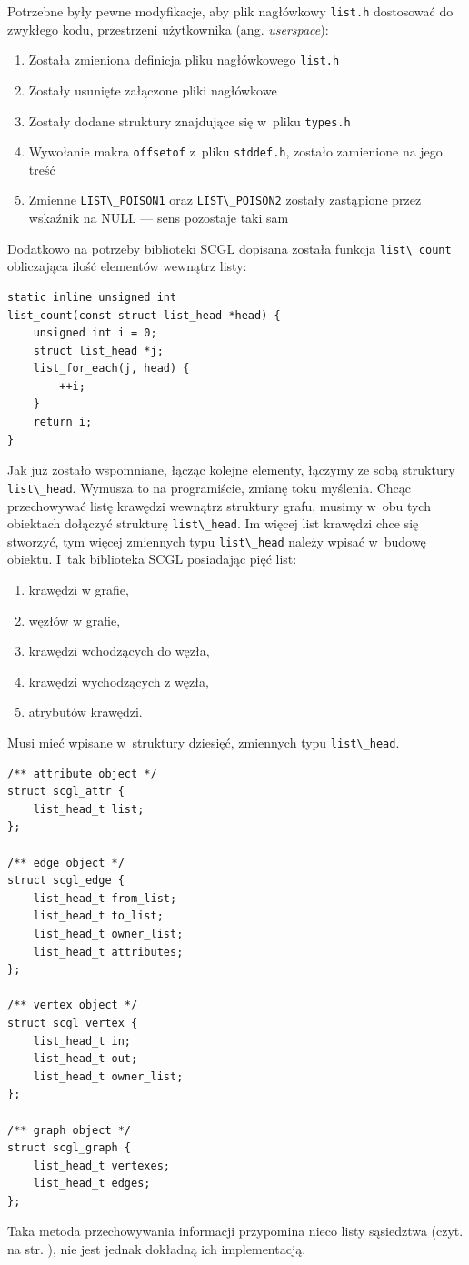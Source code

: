 \documentclass[a4paper,12pt,polish,oneside,openright]{thesis}
\newcommand\code[1]{\lstinline[style=line]{#1}}
\begin{document}
Potrzebne były pewne modyfikacje, aby plik nagłówkowy \code{list.h} dostosować do zwykłego kodu, przestrzeni użytkownika (ang. \emph{userspace}):
\begin{enumerate}
	\item Została zmieniona definicja pliku nagłówkowego \code{list.h}
	\item Zostały usunięte załączone pliki nagłówkowe
	\item Zostały dodane struktury znajdujące się w~pliku \code{types.h}
	\item Wywołanie makra \code{offsetof} z~pliku \code{stddef.h}, zostało zamienione na jego treść
	\item Zmienne \code{LIST\_POISON1} oraz \code{LIST\_POISON2} zostały zastąpione przez wskaźnik na NULL --- sens pozostaje taki sam
\end{enumerate}
Dodatkowo na potrzeby biblioteki SCGL dopisana została funkcja \code{list\_count} obliczająca ilość elementów wewnątrz listy:
\begin{lstlisting}[style=code,caption=Ciało funkcji {list\_count}]
static inline unsigned int
list_count(const struct list_head *head) {
	unsigned int i = 0;
	struct list_head *j;
	list_for_each(j, head) {
		++i;
	}
	return i;
}
\end{lstlisting}

Jak już zostało wspomniane, łącząc kolejne elementy, łączymy ze sobą struktury \code{list\_head}.
Wymusza to na programiście, zmianę toku myślenia.
Chcąc przechowywać listę krawędzi wewnątrz struktury grafu, musimy w~obu tych obiektach dołączyć strukturę \code{list\_head}.
Im więcej list krawędzi chce się stworzyć, tym więcej zmiennych typu \code{list\_head} należy wpisać w~budowę obiektu.
I~tak biblioteka SCGL posiadając pięć list:
\begin{enumerate}
	\item krawędzi w grafie,
	\item węzłów w grafie,
	\item krawędzi wchodzących do węzła,
	\item krawędzi wychodzących z węzła,
	\item atrybutów krawędzi.
\end{enumerate}
Musi mieć wpisane w~struktury dziesięć, zmiennych typu \code{list\_head}.

\begin{lstlisting}[style=code,caption=Zastosowanie Linux Kernel List na przykładzie struktur biblioteki SCGL]
/** attribute object */
struct scgl_attr {
	list_head_t list;
};

/** edge object */
struct scgl_edge {
	list_head_t from_list;
	list_head_t to_list;
	list_head_t owner_list;
	list_head_t attributes;
};

/** vertex object */
struct scgl_vertex {
	list_head_t in;
	list_head_t out;
	list_head_t owner_list;
};

/** graph object */
struct scgl_graph {
	list_head_t vertexes;
	list_head_t edges;
};
\end{lstlisting}
Taka metoda przechowywania informacji przypomina nieco listy sąsiedztwa (czyt. na str. \pageref{neigh_list}), nie jest jednak dokładną ich implementacją.
\end{document}
